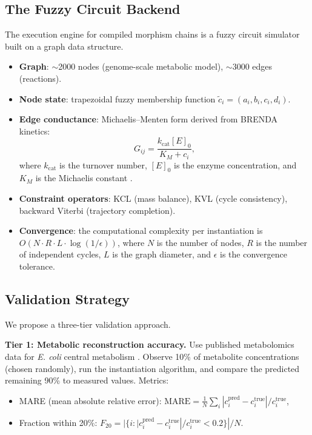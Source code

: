 \documentclass[twocolumn,10pt,a4paper]{article}
\theoremstyle{definition}
\theoremstyle{remark}
\begin{document}
\subsection{The Fuzzy Circuit Backend}

The execution engine for compiled morphism chains is a fuzzy circuit simulator built on a graph data structure.

\begin{itemize}[nosep]
    \item \textbf{Graph}: $\sim$2000 nodes (genome-scale metabolic model), $\sim$3000 edges (reactions).
    \item \textbf{Node state}: trapezoidal fuzzy membership function $\tilde{c}_i = (a_i, b_i, c_i, d_i)$.
    \item \textbf{Edge conductance}: Michaelis--Menten form derived from BRENDA kinetics:
    \begin{equation}
        G_{ij} = \frac{k_{\mathrm{cat}} [E]_0}{K_M + c_i},
        \label{eq:mm_conductance}
    \end{equation}
    where $k_{\mathrm{cat}}$ is the turnover number, $[E]_0$ is the enzyme concentration, and $K_M$ is the Michaelis constant \citep{MichaelisMenten1913}.
    \item \textbf{Constraint operators}: KCL (mass balance), KVL (cycle consistency), backward Viterbi (trajectory completion).
    \item \textbf{Convergence}: the computational complexity per instantiation is $O(N \cdot R \cdot L \cdot \log(1/\epsilon))$, where $N$ is the number of nodes, $R$ is the number of independent cycles, $L$ is the graph diameter, and $\epsilon$ is the convergence tolerance.
\end{itemize}



\subsection{Validation Strategy}

We propose a three-tier validation approach.

\textbf{Tier 1: Metabolic reconstruction accuracy.} Use published metabolomics data for \emph{E. coli} central metabolism \citep{Palsson2006}. Observe 10\% of metabolite concentrations (chosen randomly), run the instantiation algorithm, and compare the predicted remaining 90\% to measured values. Metrics:
\begin{itemize}[nosep]
    \item MARE (mean absolute relative error): $\mathrm{MARE} = \frac{1}{N} \sum_i |c_i^{\mathrm{pred}} - c_i^{\mathrm{true}}| / c_i^{\mathrm{true}}$,
    \item Fraction within 20\%: $F_{20} = |\{i : |c_i^{\mathrm{pred}} - c_i^{\mathrm{true}}|/c_i^{\mathrm{true}} < 0.2\}| / N$.
\end{itemize}
\end{document}
